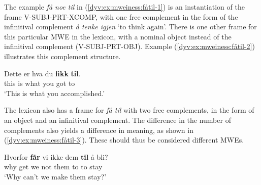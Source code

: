 \documentclass[output=paper]{langsci/langscibook}
\begin{document}
The example \emph{få noe til} in (\ref{dyv:ex:mweiness:fåtil-1}) is an instantiation of the frame V-SUBJ-PRT-XCOMP, with one free complement in the form of the infinitival complement \emph{å tenke igjen} `to think again'.  
There is one other frame for this particular MWE in the lexicon, with a nominal object instead of the infinitival complement (V-SUBJ-PRT-OBJ). 
Example (\ref{dyv:ex:mweiness:fåtil-2}) illustrates this complement structure.

\ea\label{dyv:ex:mweiness:fåtil-2}
\gll Dette er hva du \textbf{fikk} \textbf{til}. \\ 
 this is what you got to \\
\glt `This is what you accomplished.' \\ 
\z

The lexicon also has a frame for \emph{få til} with two free complements, in the form of an object and an infinitival complement. 
The difference in the number of complements also yields a difference in meaning, as shown in (\ref{dyv:ex:mweiness:fåtil-3}). 
These should thus be considered different MWEs.

\ea\label{dyv:ex:mweiness:fåtil-3}
\gll Hvorfor \textbf{får} vi ikke dem \textbf{til} å bli? \\
 why get we not them to to stay \\
\glt `Why can't we make them stay?' \\ 
\z
\end{document}
